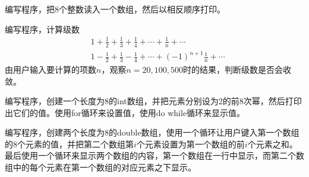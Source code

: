 \begin{frame}

\end{frame}


\begin{frame}[fragile]
\begin{free}[问题10]{}
  编写程序，把8个整数读入一个数组，然后以相反顺序打印。
\end{free}
\end{frame}

\begin{frame}

\end{frame}

\begin{frame}[fragile]
\begin{free}[问题11]{}
  编写程序，计算级数
$$
\begin{aligned}
&1+\frac12 + \frac13 + \frac14 + \cdots + \frac1n + \cdots\\
&1-\frac12 + \frac13 - \frac14 + \cdots + (-1)^{n+1}\frac1n + \cdots
\end{aligned}
$$
由用户输入要计算的项数$n$，观察$n=20,100,500$时的结果，判断级数是否会收敛。
\end{free}
\end{frame}

\begin{frame}

\end{frame}


\begin{frame}[fragile]
\begin{free}[问题12]{}
  编写程序，创建一个长度为8的int数组，并把元素分别设为2的前8次幂，然后打印出它们的值。使用for循环来设置值，使用do while循环来显示值。
\end{free}
\end{frame}

\begin{frame}

\end{frame}


\begin{frame}[fragile]
\begin{free}[问题13]{}
  编写程序，创建两个长度为8的double数组，使用一个循环让用户键入第一个数组的8个元素的值，并把第二个数组第$i$个元素设置为第一个数组的前$i$个元素之和。最后使用一个循环来显示两个数组的内容，第一个数组在一行中显示，而第二个数组中的每个元素在第一个数组的对应元素之下显示。
\end{free}
\end{frame}

